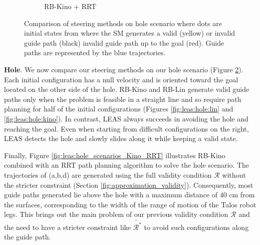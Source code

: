 \begin{figure}[h]
\begin{subfigure}[t]{0.4\linewidth}
    \caption{RB-Kino + RRT}
    \label{fig:leas:hole_scenarios_Kino_RRT}
    \label{fig:leas:hole:kino_rrt}
    \end{subfigure}
    \caption{Comparison of steering methods on hole scenario where dots are initial states from where the SM generates a valid (yellow) or invalid guide path (black) invalid guide path up to the goal (red). Guide paths are represented by the blue trajectories.}
    \label{fig:leas:hole_scenarios}
\end{figure}

\noindent\textbf{Hole}. We now compare our steering methods on our hole scenario (Figure \ref{fig:leas:hole_scenarios}). Each initial configuration has a null velocity and is oriented toward the goal located on the other side of the hole. 
RB-Kino and RB-Lin generate valid guide paths only when the problem is feasible in a straight line and so require path planning for half of the initial configurations (Figures \ref{fig:leas:hole:lin} and \ref{fig:leas:hole:kino}).
In contrast, LEAS always succeeds in avoiding the hole and reaching the goal.
Even when starting from difficult configurations on the right, LEAS detects the hole and slowly slides along it while keeping a valid state.



Finally, Figure \ref{fig:leas:hole_scenarios_Kino_RRT} illustrates RB-Kino combined with an RRT path planning algorithm to solve the hole scenario. The trajectories of (a,b,d) are generated using the full validity condition $\mathcal{R}$ without the stricter constraint (Section \ref{fig:approximation_validity}). Consequently, most guide paths generated lie above the hole with a maximum distance of $40$ cm from the surfaces, corresponding to the width of the range of motion of the Talos robot legs. 
This brings out the main problem of our previous validity condition $\mathcal{R}$ and the need to have a stricter constraint like $\tilde{\mathcal{R}^*}$ to avoid such configurations along the guide path.


